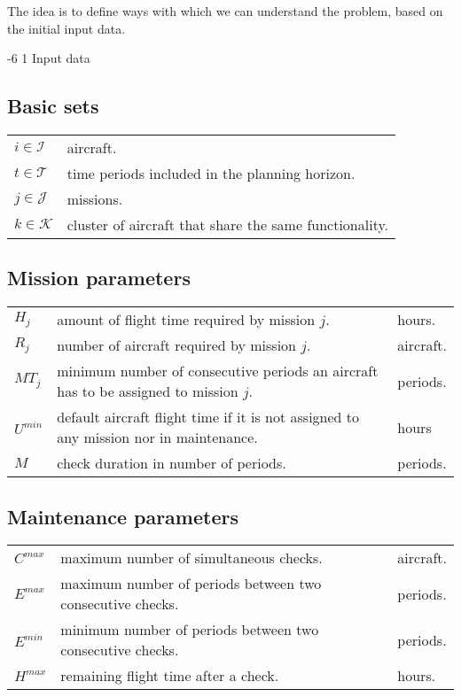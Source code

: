 \documentclass[a4paper,onecolumn,fleqn]{article}
\makeatletter
\renewcommand\section{\@startsection{section}{1}{\z@}%
                       {-6\p@ \@plus -0\p@ \@minus -0\p@}%
                       {2\p@ \@plus 0\p@ \@minus 0\p@}%
                       {\normalsize\textbf}}
\renewcommand\section{\@startsection{section}{2}{\z@}%
                       {-6\p@ \@plus -0\p@ \@minus -0\p@}%
                       {2\p@ \@plus 0\p@ \@minus 0\p@}%
                       {\normalsize\textbf}}
\renewcommand\section{\@startsection{section}{3}{\z@}%
                       {-6\p@ \@plus -0\p@ \@minus -0\p@}%
                       {1\p@ \@plus 0\p@ \@minus 0\p@}%
                       {\normalsize\itshape\bfseries}}
\makeatother
\begin{document}
The idea is to define ways with which we can understand the problem, based on the initial input data.

\section{Input data}
    \subsection{Basic sets}

        \begin{tabular}{p{15mm}p{140mm}}
            $i \in \mathcal{I}$     &  aircraft. \\
            $t \in \mathcal{T}$     &  time periods included in the planning horizon. \\
            $j \in \mathcal{J}$     &  missions. \\
            $k \in \mathcal{K}$     &  cluster of aircraft that share the same functionality. \\
        \end{tabular}

    \subsection{Mission parameters}

        \begin{tabular}{p{15mm}p{125mm}p{15mm}}
            $H_j$             & amount of flight time required by mission $j$. & hours. \\
            $R_j$             & number of aircraft required by mission $j$. & aircraft. \\
            $MT_j$            & minimum number of consecutive periods an aircraft has to be assigned to mission $j$. & periods. \\
            $U^{min}$         & default aircraft flight time if it is not assigned to any mission nor in maintenance.& hours \\
            $M$               & check duration in number of periods. & periods. \\
        \end{tabular}

    \subsection{Maintenance parameters}

        \begin{tabular}{p{15mm}p{125mm}p{15mm}}
            $C^{max}$         & maximum number of simultaneous checks. & aircraft. \\
            $E^{max}$         & maximum number of periods between two consecutive checks. & periods. \\
            $E^{min}$         & minimum number of periods between two consecutive checks. & periods. \\
            $H^{max}$         & remaining flight time after a check. & hours. \\
        \end{tabular}
\end{document}
